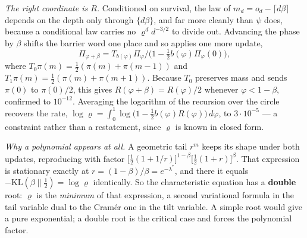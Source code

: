 \documentclass[11pt,a4paper]{article}
\begin{document}
\emph{The right coordinate is \(R\).} Conditioned on survival, the law
of \(m_d=o_d-\lceil d\beta\rceil\) depends on the depth only through
\(\{d\beta\}\), and far more cleanly than \(\psi\) does, because a
conditional law carries no \(\varrho^{d}d^{-3/2}\) to divide out.
Advancing the phase by \(\beta\) shifts the barrier word one place and
so applies one more update, \[
\Pi_{\varphi+\beta}=T_{b(\varphi)}\Pi_\varphi\big/\bigl(1-\tfrac12
b(\varphi)\Pi_\varphi(0)\bigr),
\] where \(T_0\pi(m)=\tfrac12(\pi(m)+\pi(m-1))\) and
\(T_1\pi(m)=\tfrac12(\pi(m)+\pi(m+1))\). Because \(T_0\) preserves mass
and sends \(\pi(0)\) to \(\pi(0)/2\), this gives
\(R(\varphi+\beta)=R(\varphi)/2\) whenever \(\varphi<1-\beta\),
confirmed to \(10^{-12}\). Averaging the logarithm of the recursion over
the circle recovers the rate,
\(\log\varrho=\int_0^1\log\bigl(1-\tfrac12 b(\varphi)R(\varphi)\bigr)
\,d\varphi\), to \(3\cdot10^{-5}\) --- a constraint rather than a
restatement, since \(\varrho\) is known in closed form.

\emph{Why a polynomial appears at all.} A geometric tail \(r^m\) keeps
its shape under both updates, reproducing with factor
\(\bigl[\tfrac12(1+1/r)\bigr]^{1-\beta}\bigl[\tfrac12(1+r)\bigr]^{\beta}\).
That expression is stationary exactly at \(r=(1-\beta)/\beta=
e^{-\lambda^{*}}\), and there it equals \(-\mathrm{KL}(\beta\|\tfrac12)
=\log\varrho\) identically. So the characteristic equation has a
\textbf{double} root: \(\varrho\) is the \emph{minimum} of that
expression, a second variational formula in the tail variable dual to
the Cram\'{e}r one in the tilt variable. A simple root would give a pure
exponential; a double root is the critical case and forces the
polynomial factor.
\end{document}
